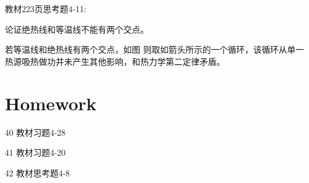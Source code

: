 \documentclass[CJK]{beamer}
\begin{document}
\begin{frame}
\chtitle{\proid (\sone)}
\bch

教材223页思考题4-11:

论证绝热线和等温线不能有两个交点。
\ech
\end{frame}


\begin{frame}
\bch
若等温线和绝热线有两个交点，如图
则取如箭头所示的一个循环，该循环从单一热源吸热做功并未产生其他影响，和热力学第二定律矛盾。

\ech
\end{frame}


\section{Homework}

\begin{frame}
  \bch
  {\small 
    \bitem
\item[40]{教材习题4-28}
\item[41]{教材习题4-20}
\item[42]{教材思考题4-8}
  \eitem
  }
  \ech
\end{frame}
\end{document}
